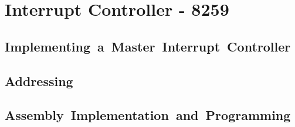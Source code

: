 \newpage
\section{Interrupt Controller - 8259}

    \subsection{Implementing a Master Interrupt Controller}

    \subsection{Addressing}

    \subsection{Assembly Implementation and Programming}
